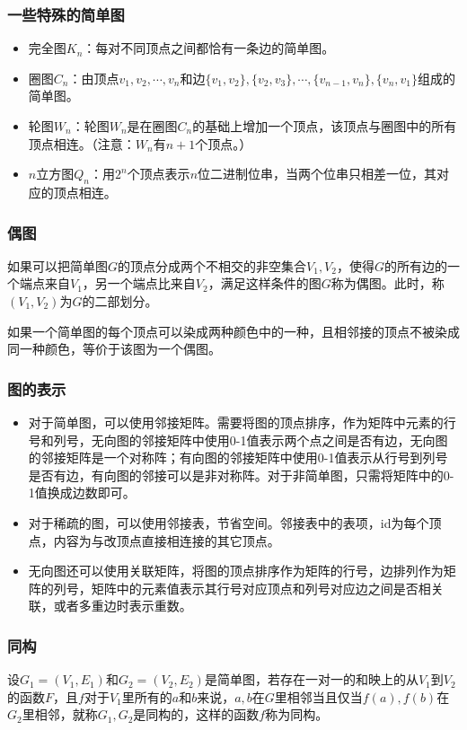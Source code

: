 \subsubsection*{一些特殊的简单图}
\begin{itemize}
    \item 完全图$K_n$：每对不同顶点之间都恰有一条边的简单图。
    \item 圈图$C_n$：由顶点$v_1, v_2, \cdots, v_n$和边$\{v_1, v_2\}, \{v_2, v_3\}, \cdots, \{v_{n-1}, v_n\}, \{v_n, v_1\}$组成的简单图。
    \item 轮图$W_n$：轮图$W_n$是在圈图$C_n$的基础上增加一个顶点，该顶点与圈图中的所有顶点相连。（注意：$W_n$有$n+1$个顶点。）
    \item $n$立方图$Q_n$：用$2^n$个顶点表示$n$位二进制位串，当两个位串只相差一位，其对应的顶点相连。
\end{itemize}

\subsubsection*{偶图}
如果可以把简单图$G$的顶点分成两个不相交的非空集合$V_1,V_2$，使得$G$的所有边的一个端点来自$V_1$，另一个端点比来自$V_2$，满足这样条件的图$G$称为偶图。此时，称$(V_1,V_2)$为$G$的二部划分。

如果一个简单图的每个顶点可以染成两种颜色中的一种，且相邻接的顶点不被染成同一种颜色，等价于该图为一个偶图。

\subsubsection*{图的表示}
\begin{itemize}
    \item 对于简单图，可以使用邻接矩阵。需要将图的顶点排序，作为矩阵中元素的行号和列号，无向图的邻接矩阵中使用0-1值表示两个点之间是否有边，无向图的邻接矩阵是一个对称阵；有向图的邻接矩阵中使用0-1值表示从行号到列号是否有边，有向图的邻接可以是非对称阵。对于非简单图，只需将矩阵中的0-1值换成边数即可。
    \item 对于稀疏的图，可以使用邻接表，节省空间。邻接表中的表项，id为每个顶点，内容为与改顶点直接相连接的其它顶点。
    \item 无向图还可以使用关联矩阵，将图的顶点排序作为矩阵的行号，边排列作为矩阵的列号，矩阵中的元素值表示其行号对应顶点和列号对应边之间是否相关联，或者多重边时表示重数。
\end{itemize}

\subsubsection*{同构}
设$G_1 = (V_1, E_1)$和$G_2 = (V_2, E_2)$是简单图，若存在一对一的和映上的从$V_1$到$V_2$的函数$F$，且$f$对于$V_1$里所有的$a$和$b$来说，$a,b$在$G$里相邻当且仅当$f(a), f(b)$在$G_2$里相邻，就称$G_1,G_2$是同构的，这样的函数$f$称为同构。

